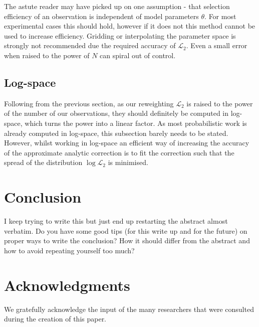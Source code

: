 \documentclass[a4paper,fleqn,usenatbib]{mnras}
\newcommand{\red}{\color{red}}
\begin{document}
The astute reader may have picked up on one assumption - that selection efficiency of an observation is independent of model parameters $\theta$. For most experimental cases this should hold, however if it does not this method cannot be used to increase efficiency. Gridding or interpolating the parameter space is strongly not recommended due the required accuracy of $\mathcal{L}_2$. Even a small error when raised to the power of $N$ can spiral out of control.

\subsection{Log-space}

Following from the previous section, as our reweighting $\mathcal{L}_2$ is raised to the power of the number of our observations, they should definitely be computed in log-space, which turns the power into a linear factor. As most probabilistic work is already computed in log-space, this subsection barely needs to be stated. However, whilst working in log-space an efficient way of increasing the accuracy of the approximate analytic correction is to fit the correction such that the spread of the distribution $\log\mathcal{L}_2$ is minimised. 











\pagebreak


\section{Conclusion}
\label{sec:conclusion}


{\red I keep trying to write this but just end up restarting the abstract almost verbatim. Do you have some good tips (for this write up and for the future) on proper ways to write the conclusion? How it should differ from the abstract and how to avoid repeating yourself too much?}






\section*{Acknowledgments}

We gratefully acknowledge the input of the many researchers that were consulted during the creation of this paper.



\bsp	%
\label{lastpage}
\end{document}
